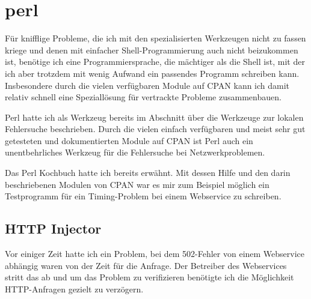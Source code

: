 \section{perl}
\label{sec:netz-werkzeuge-perl}
\begin{abstractsec}
  Für knifflige Probleme, die ich mit den spezialisierten Werkzeugen nicht zu
  fassen kriege und denen mit einfacher Shell-Programmierung auch nicht
  beizukommen ist, benötige ich eine Programmiersprache, die mächtiger als die
  Shell ist, mit der ich aber trotzdem mit wenig Aufwand ein passendes
  Programm schreiben kann. Insbesondere durch die vielen verfügbaren Module
  auf CPAN kann ich damit relativ schnell eine Speziallösung für vertrackte
  Probleme zusammenbauen.
\end{abstractsec}
\begin{normaltext}
  Perl hatte ich als Werkzeug bereits im Abschnitt über die Werkzeuge zur
  lokalen Fehlersuche beschrieben. Durch die vielen einfach verfügbaren und
  meist sehr gut getesteten und dokumentierten Module auf CPAN ist Perl auch
  ein unentbehrliches Werkzeug für die Fehlersuche bei Netzwerkproblemen.

  Das Perl Kochbuch \cite{ChristiansenTorkington04de} hatte ich bereits
  erwähnt. Mit dessen Hilfe und den darin beschriebenen Modulen von CPAN war
  es mir zum Beispiel möglich ein Testprogramm für ein Timing-Problem bei
  einem Webservice zu schreiben.

  \subsection*{HTTP Injector}

  Vor einiger Zeit hatte ich ein Problem, bei dem 502-Fehler von
  einem Webservice abhängig waren von der Zeit für die
  Anfrage. Der Betreiber des Webservices stritt das ab und um das
  Problem zu verifizieren benötigte ich die Möglichkeit HTTP-Anfragen gezielt
  zu verzögern.
  

\end{normaltext}
